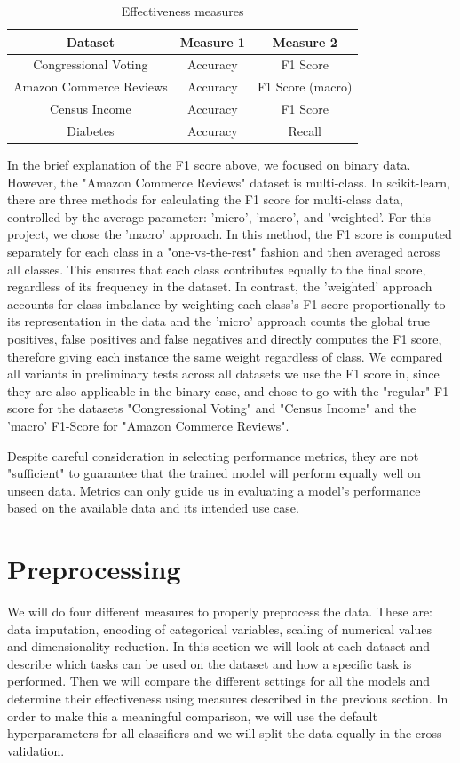 \documentclass[a4paper,10pt]{article}
\begin{document}
\begin{table}[h]
\centering
\begin{tabular}{|c|c|c|}
\hline
Dataset & Measure 1 & Measure 2 \\ \hline
Congressional Voting & Accuracy & F1 Score \\ 
Amazon Commerce Reviews & Accuracy & F1 Score (macro) \\ 
Census Income & Accuracy & F1 Score \\ 
Diabetes & Accuracy & Recall \\ \hline
\end{tabular}
\caption{Effectiveness measures}
\label{tab:effectiveness_measures}
\end{table}
In the brief explanation of the F1 score above, we focused on binary data. However, the "Amazon Commerce Reviews" dataset is multi-class. In scikit-learn, there are three methods for calculating the F1 score for multi-class data, controlled by the average parameter: 'micro', 'macro', and 'weighted'. For this project, we chose the 'macro' approach. In this method, the F1 score is computed separately for each class in a "one-vs-the-rest" fashion and then averaged across all classes. This ensures that each class contributes equally to the final score, regardless of its frequency in the dataset. In contrast, the 'weighted' approach accounts for class imbalance by weighting each class's F1 score proportionally to its representation in the data and the 'micro' approach counts the global true positives, false positives and false negatives and directly computes the F1 score, therefore giving each instance the same weight regardless of class.  We compared all variants in preliminary tests across all datasets we use the F1 score in, since they are also applicable in the binary case, and chose to go with the "regular" F1-score for the datasets "Congressional Voting" and "Census Income" and the 'macro' F1-Score for "Amazon Commerce Reviews".

Despite careful consideration in selecting performance metrics, they are not "sufficient" to guarantee that the trained model will perform equally well on unseen data. Metrics can only guide us in evaluating a model's performance based on the available data and its intended use case.

\section{Preprocessing}
\label{sec:preprocessing}
We will do four different measures to properly preprocess the data. These are: data imputation, encoding of categorical variables,
scaling of numerical values and dimensionality reduction. In this section we will look at each dataset and 
describe which tasks can be used on the dataset and how a specific task is performed. Then we will compare the different
settings for all the models and determine their effectiveness using measures described in the previous section. 
In order to make this a meaningful comparison, we will use the default hyperparameters for all classifiers and 
we will split the data equally in the cross-validation.
\end{document}
